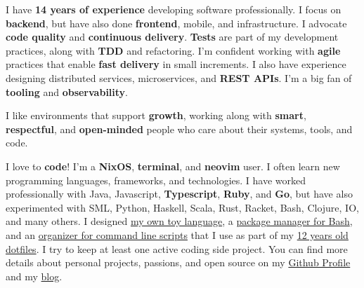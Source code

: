 \documentclass[10pt,a4paper,ragged2e,withhyper]{altacv}
\begin{document}
\begin{paracol}{2}






\switchcolumn

%

%
%
%


I have \textbf{14 years of experience} developing software professionally. I focus on \textbf{backend}, but have also done \textbf{frontend}, mobile, and infrastructure. I advocate \textbf{code quality} and \textbf{continuous delivery}. \textbf{Tests} are part of my development practices, along with \textbf{TDD} and refactoring. I’m confident working with \textbf{agile} practices that enable \textbf{fast delivery} in small increments. I also have experience designing distributed services, microservices, and \textbf{REST APIs}. I'm a big fan of \textbf{tooling} and \textbf{observability}.

\begingroup
\setlength{\parskip}{1em}

I like environments that support \textbf{growth}, working along with \textbf{smart}, \textbf{respectful}, and \textbf{open-minded} people who care about their systems, tools, and code.

I love to \textbf{code}! I'm a \textbf{NixOS}, \textbf{terminal}, and \textbf{neovim} user. I often learn new programming languages, frameworks, and technologies. I have worked professionally with Java, Javascript, \textbf{Typescript}, \textbf{Ruby}, and \textbf{Go}, but have also experimented with SML, Python, Haskell, Scala, Rust, Racket, Bash, Clojure, IO, and many others. I designed \href{https://github.com/juanibiapina/marco}{my own toy language}, a \href{https://github.com/basherpm/basher}{package manager for Bash}, and an \href{https://github.com/juanibiapina/sub}{organizer for command line scripts} that I use as part of my \href{https://github.com/juanibiapina/dotfiles}{12 years old dotfiles}. I try to keep at least one active coding side project. You can find more details about personal projects, passions, and open source on my \href{https://github.com/juanibiapina/}{Github Profile} and my \href{https://juanibiapina.github.io/}{blog}.


\end{paracol}
\end{document}
